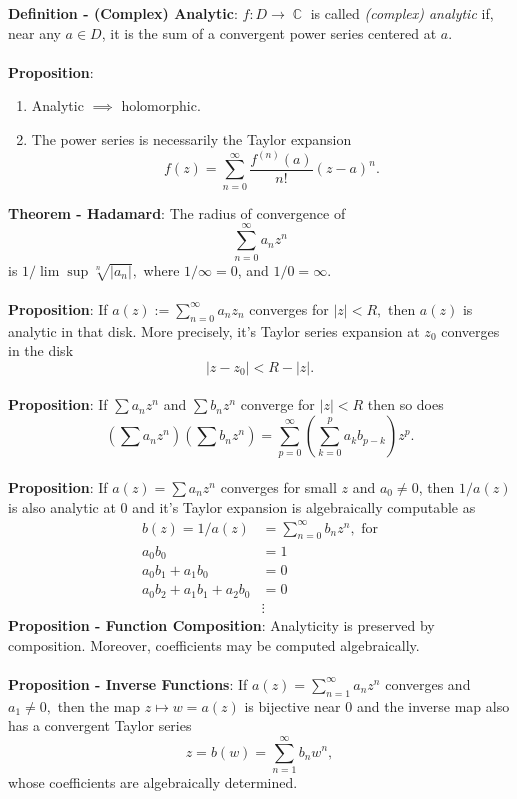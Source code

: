 \documentclass{article}
\DeclareMathOperator{\C}{\mathbb{C}}
\begin{document}
\textbf{Definition - (Complex) Analytic}: $f: D \rightarrow \C$ is called \textit{(complex) analytic} if, near any $a \in D$, it is the sum of a convergent power series centered at $a$. \\ \\
\textbf{Proposition}: \begin{enumerate}
    \item Analytic $\implies$ holomorphic.
    \item The power series is necessarily the Taylor expansion $$f(z) = \sum_{n = 0}^\infty \frac{f^{(n)}(a)}{n!}(z - a)^n.$$
\end{enumerate} $ $ \\
\textbf{Theorem - Hadamard}: The radius of convergence of $$\sum_{n = 0}^\infty a_n z^n$$ is $1/\lim{\sup{\sqrt[n]{|a_n|}}},$ where $1/\infty = 0$, and $1/0 = \infty$. \\ \\
\textbf{Proposition}: If $a(z) := \sum_{n = 0}^\infty a_n z_n$ converges for $|z| < R,$ then $a(z)$ is analytic in that disk. More precisely, it's Taylor series expansion at $z_0$ converges in the disk $$|z - z_0| < R - |z|.$$ \\
\textbf{Proposition}: If $\sum a_n z^n$ and $\sum b_n z^n$ converge for $|z| < R$ then so does $$\left( \sum a_n z^n \right) \left( \sum b_n z^n \right) = \sum_{p = 0}^\infty \left( \sum_{k = 0}^p a_k b_{p - k} \right) z^p.$$ \\
\textbf{Proposition}: If $a(z) = \sum a_n z^n$ converges for small $z$ and $a_0 \neq 0$, then $1/a(z)$ is also analytic at $0$ and it's Taylor expansion is algebraically computable as \begin{align*}
    b(z) = 1/a(z) &= \sum_{n = 0}^\infty b_n z^n, \text{ for} \\
    a_0 b_0 &= 1 \\
    a_0 b_1 + a_1 b_0 &= 0 \\
    a_0 b_2 + a_1 b_1 +  a_2 b_0 &= 0 \\
    &\vdots
\end{align*} $ $ \\
\textbf{Proposition - Function Composition}: Analyticity is preserved by composition. Moreover, coefficients may be computed algebraically. \\ \\
\textbf{Proposition - Inverse Functions}: If $a(z) = \sum_{n = 1}^\infty a_n z^n$ converges and $a_1 \neq 0,$ then the map $z \mapsto w = a(z)$ is bijective near $0$ and the inverse map also has a convergent Taylor series $$z = b(w) = \sum_{n = 1}^\infty b_n w^n,$$ whose coefficients are algebraically determined. \\ \\
\end{document}
